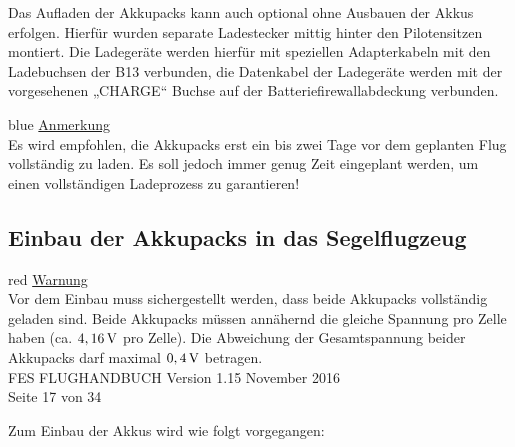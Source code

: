 Das Aufladen der Akkupacks kann auch optional ohne Ausbauen der Akkus erfolgen. Hierfür wurden separate Ladestecker mittig hinter den Pilotensitzen montiert. 
Die Ladegeräte werden hierfür mit speziellen Adapterkabeln mit den Ladebuchsen der B13 verbunden, die Datenkabel der Ladegeräte werden mit der vorgesehenen „CHARGE“ Buchse auf der Batteriefirewallabdeckung verbunden.\\

\begin{color}{blue}
\large{\underline{Anmerkung}}\\
Es wird empfohlen, die Akkupacks erst ein bis zwei Tage vor
dem geplanten Flug vollständig zu laden. Es soll jedoch immer genug Zeit
eingeplant werden, um einen vollständigen Ladeprozess zu garantieren!
\end{color}

\subsection{Einbau der Akkupacks in das Segelflugzeug}

\begin{color}{red}
\large{\underline{Warnung}}\\
Vor dem Einbau muss sichergestellt werden, dass beide
Akkupacks vollständig geladen sind. Beide Akkupacks müssen annähernd die
gleiche Spannung pro Zelle haben (ca. $\unit[4,16]{V}$ pro Zelle). Die Abweichung der
Gesamtspannung beider Akkupacks darf maximal $\unit[0,4]{V}$ betragen.\\
FES FLUGHANDBUCH Version 1.15 November 2016\\
Seite 17 von 34
\end{color}

Zum Einbau der Akkus wird wie folgt vorgegangen:

